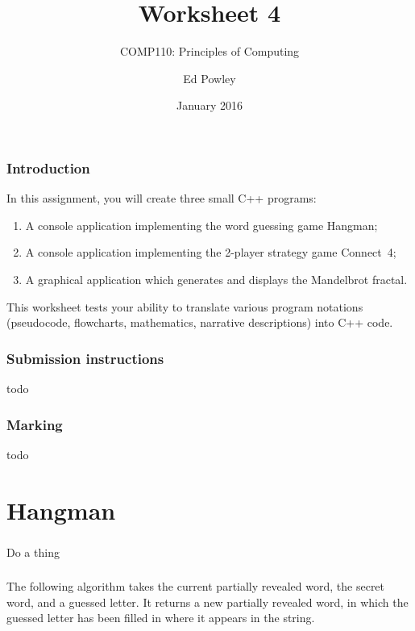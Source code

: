 \documentclass{scrartcl}
\title{Worksheet 4}
\subtitle{COMP110: Principles of Computing}
\author{Ed Powley}
\date{January 2016}
\begin{document}
\maketitle

\section*{Introduction}

In this assignment, you will create three small C++ programs:
\begin{enumerate}[label=\Alph*.]
	\item A console application implementing the word guessing game Hangman;
	\item A console application implementing the 2-player strategy game Connect~4;
	\item A graphical application which generates and displays the Mandelbrot fractal.
\end{enumerate}

This worksheet tests your ability to translate various program notations (pseudocode, flowcharts,
mathematics, narrative descriptions) into C++ code.

\section*{Submission instructions}

todo

\section*{Marking}

todo

\clearpage
\part{Hangman}

\section{}
Do a thing

\section{}

The following algorithm takes the current partially revealed word, the secret word, and a guessed letter.
It returns a new partially revealed word, in which the guessed letter has been filled in where it appears in the string.
\end{document}

